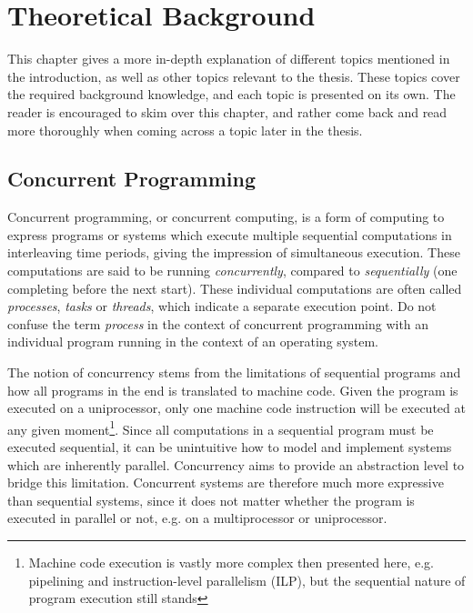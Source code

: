 

\chapter{Theoretical Background}
\label{ch:theoretical_background}


This chapter gives a more in\hyp{}depth explanation of different topics mentioned in the introduction, as well as other topics relevant to the thesis. These topics cover the required background knowledge, and each topic is presented on its own. The reader is encouraged to skim over this chapter, and rather come back and read more thoroughly when coming across a topic later in the thesis.


\section{Concurrent Programming}
\label{sec:concurrent_programming}


Concurrent programming, or concurrent computing, is a form of computing to express programs or systems which execute multiple sequential computations in interleaving time periods, giving the impression of simultaneous execution. These computations are said to be running \textit{concurrently}, compared to \textit{sequentially} (one completing before the next start). These individual computations are often called \textit{processes}, \textit{tasks} or \textit{threads}, which indicate a separate execution point. Do not confuse the term \textit{process} in the context of concurrent programming with an individual program running in the context of an operating system.

The notion of concurrency stems from the limitations of sequential programs and how all programs in the end is translated to machine code. Given the program is executed on a uniprocessor, only one machine code instruction will be executed at any given moment\footnote{Machine code execution is vastly more complex then presented here, e.g. pipelining and instruction\hyp{}level parallelism (ILP), but the sequential nature of program execution still stands}.  Since all computations in a sequential program must be executed sequential, it can be unintuitive how to model and implement systems which are inherently parallel. Concurrency aims to provide an abstraction level to bridge this limitation. Concurrent systems are therefore much more expressive than sequential systems, since it does not matter whether the program is executed in parallel or not, e.g. on a multiprocessor or uniprocessor.

